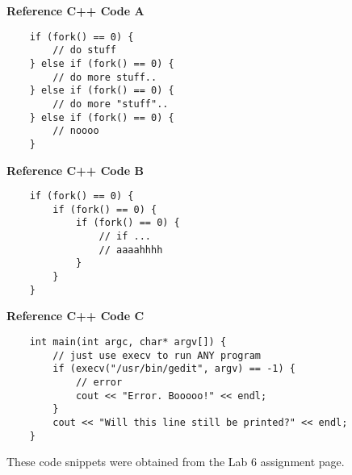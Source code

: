 \documentclass{article}
\begin{document}
{\Large \textbf{Reference C++ Code A}}
\begin{verbatim}
    if (fork() == 0) {
        // do stuff
    } else if (fork() == 0) {
        // do more stuff..
    } else if (fork() == 0) {
        // do more "stuff"..
    } else if (fork() == 0) {
        // noooo
    }
\end{verbatim}

{\Large \textbf{Reference C++ Code B}}
\begin{verbatim}
    if (fork() == 0) {
        if (fork() == 0) {
            if (fork() == 0) {
                // if ...
                // aaaahhhh
            }
        }
    }
\end{verbatim}

{\Large \textbf{Reference C++ Code C}}
\begin{verbatim}
    int main(int argc, char* argv[]) {
        // just use execv to run ANY program
        if (execv("/usr/bin/gedit", argv) == -1) {
            // error
            cout << "Error. Booooo!" << endl;
        }
        cout << "Will this line still be printed?" << endl;
    }
\end{verbatim}

These code snippets were obtained from the Lab 6 assignment page.

\vfill
\newpage
\end{document}
